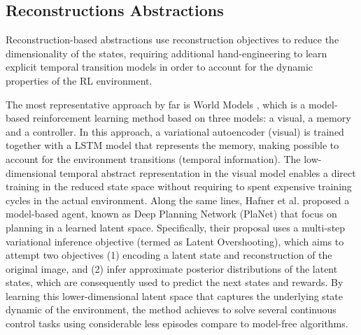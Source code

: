 \subsection{Reconstructions Abstractions}

Reconstruction-based abstractions use reconstruction objectives to reduce the dimensionality of the states, requiring additional hand-engineering to learn explicit temporal transition models in order to account for the dynamic properties of the RL environment. 

The most representative approach by far is World Models \cite{ha2018world}, which is a model-based reinforcement learning method based on three models: a visual, a memory and a controller. In this approach, a variational autoencoder (visual) is trained together with a LSTM model that represents the memory, making possible to account for the environment transitions (temporal information). The low-dimensional temporal abstract representation in the visual model enables a direct training in the reduced state space without requiring to spent expensive training cycles in the actual environment. Along the same lines, Hafner et al. \cite{hafner2019learning} proposed a model-based agent, known as Deep Planning Network (PlaNet) that focus on planning in a learned latent space. Specifically, their proposal uses a multi-step variational inference objective (termed as Latent Overshooting), which aims to attempt two objectives (1) encoding a latent state and reconstruction of the original image, and (2) infer approximate posterior distributions of the latent states, which are consequently used to predict the next states and rewards. By learning this lower-dimensional latent space that captures the underlying state dynamic of the environment, the method achieves to solve several continuous control tasks using considerable less episodes compare to model-free algorithms.





 

